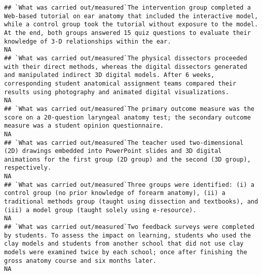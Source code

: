 \documentclass[]{article}
\begin{document}
\begin{verbatim}
## `What was carried out/measured`The intervention group completed a Web-based tutorial on ear anatomy that included the interactive model, while a control group took the tutorial without exposure to the model. At the end, both groups answered 15 quiz questions to evaluate their knowledge of 3-D relationships within the ear.                                                                                                                                                   NA
## `What was carried out/measured`The physical dissectors proceeded with their direct methods, whereas the digital dissectors generated and manipulated indirect 3D digital models. After 6 weeks, corresponding student anatomical assignment teams compared their results using photography and animated digital visualizations.                                                                                                                                                       NA
## `What was carried out/measured`The primary outcome measure was the score on a 20-question laryngeal anatomy test; the secondary outcome measure was a student opinion questionnaire.                                                                                                                                                                                                                                                                                                  NA
## `What was carried out/measured`The teacher used two-dimensional (2D) drawings embedded into PowerPoint slides and 3D digital animations for the first group (2D group) and the second (3D group), respectively.                                                                                                                                                                                                                                                                       NA
## `What was carried out/measured`Three groups were identified: (i) a control group (no prior knowledge of forearm anatomy), (ii) a traditional methods group (taught using dissection and textbooks), and (iii) a model group (taught solely using e-resource).                                                                                                                                                                                                                         NA
## `What was carried out/measured`Two feedback surveys were completed by students. To assess the impact on learning, students who used the clay models and students from another school that did not use clay models were examined twice by each school; once after finishing the gross anatomy course and six months later.                                                                                                                                                             NA

\end{verbatim}
\end{document}
